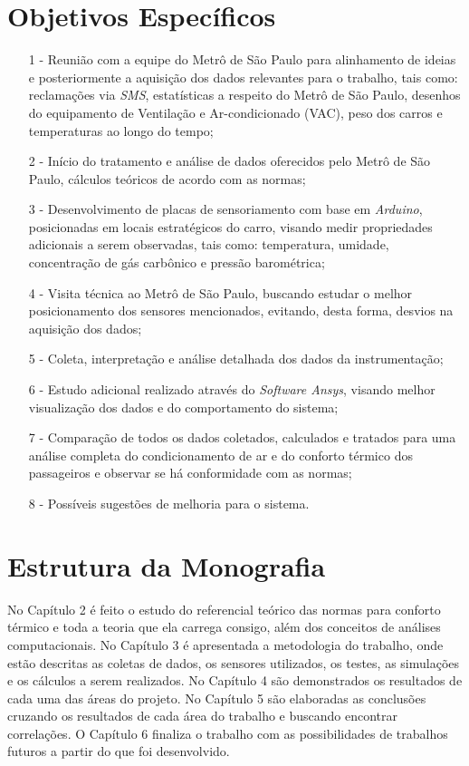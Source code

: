 \documentclass[acronym,symbols,table]{fei}
\begin{document}
\section{Objetivos Específicos}

\begin{itemize}
    \item[1 -]Reunião com a equipe do Metrô de São Paulo para alinhamento de ideias e posteriormente a  aquisição dos dados relevantes para o trabalho, tais como: reclamações via \textit{SMS}, estatísticas a respeito do Metrô de São Paulo, desenhos do equipamento de Ventilação e Ar-condicionado (VAC), peso dos carros e temperaturas ao longo do tempo;
    \item[2 -]Início do tratamento e análise de dados oferecidos pelo Metrô de São Paulo, cálculos teóricos de acordo com as normas;
    \item[3 -]Desenvolvimento de placas de sensoriamento com base em \textit{Arduino}, posicionadas em locais estratégicos do carro, visando medir propriedades adicionais a serem observadas, tais como: temperatura, umidade, concentração de gás carbônico e pressão barométrica;
    \item[4 -]Visita técnica ao Metrô de São Paulo, buscando estudar o melhor posicionamento dos sensores mencionados, evitando, desta forma, desvios na aquisição dos dados;
    \item[5 -]Coleta, interpretação e análise detalhada dos dados da instrumentação;
    \item[6 -]Estudo adicional realizado através do \textit{Software Ansys}, visando melhor visualização dos dados e do comportamento do sistema;
    \item[7 -]Comparação de todos os dados coletados, calculados e tratados para uma análise completa do condicionamento de ar e do conforto térmico dos passageiros e observar se há conformidade com as normas;
    \item[8 -]Possíveis sugestões de melhoria para o sistema.
\end{itemize}

\section{Estrutura da Monografia} %

No Capítulo 2 é feito o estudo do referencial teórico das normas para conforto térmico e toda a teoria que ela carrega consigo, além dos conceitos de análises computacionais. No Capítulo 3 é apresentada a metodologia do trabalho, onde estão descritas as coletas de dados, os sensores utilizados, os testes, as simulações e os cálculos a serem realizados. No Capítulo 4 são demonstrados os resultados de cada uma das áreas do projeto. No Capítulo 5 são elaboradas as conclusões cruzando os resultados de cada área do trabalho e buscando encontrar correlações. O Capítulo 6 finaliza o trabalho com as possibilidades de trabalhos futuros a partir do que foi desenvolvido.
\end{document}
